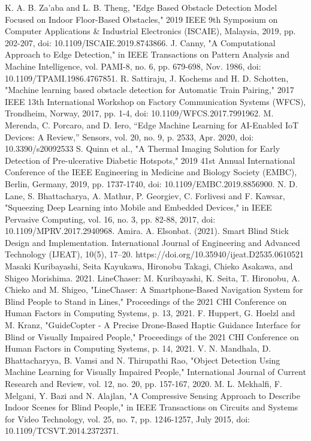 \documentclass[conference]{IEEEtran}
\begin{document}
\begin{thebibliography}{00}
 K. A. B. Za’aba and L. B. Theng, "Edge Based Obstacle Detection Model Focused on Indoor Floor-Based Obstacles," 2019 IEEE 9th Symposium on Computer Applications \& Industrial Electronics (ISCAIE), Malaysia, 2019, pp. 202-207, doi: 10.1109/ISCAIE.2019.8743866.
 J. Canny, "A Computational Approach to Edge Detection," in IEEE Transactions on Pattern Analysis and Machine Intelligence, vol. PAMI-8, no. 6, pp. 679-698, Nov. 1986, doi: 10.1109/TPAMI.1986.4767851.
 R. Sattiraju, J. Kochems and H. D. Schotten, "Machine learning based obstacle detection for Automatic Train Pairing," 2017 IEEE 13th International Workshop on Factory Communication Systems (WFCS), Trondheim, Norway, 2017, pp. 1-4, doi: 10.1109/WFCS.2017.7991962.
 M. Merenda, C. Porcaro, and D. Iero, “Edge Machine Learning for AI-Enabled IoT Devices: A Review,” Sensors, vol. 20, no. 9, p. 2533, Apr. 2020, doi: 10.3390/s20092533
 S. Quinn et al., "A Thermal Imaging Solution for Early Detection of Pre-ulcerative Diabetic Hotspots," 2019 41st Annual International Conference of the IEEE Engineering in Medicine and Biology Society (EMBC), Berlin, Germany, 2019, pp. 1737-1740, doi: 10.1109/EMBC.2019.8856900.
 N. D. Lane, S. Bhattacharya, A. Mathur, P. Georgiev, C. Forlivesi and F. Kawsar, "Squeezing Deep Learning into Mobile and Embedded Devices," in IEEE Pervasive Computing, vol. 16, no. 3, pp. 82-88, 2017, doi: 10.1109/MPRV.2017.2940968.
 Amira. A. Elsonbat. (2021). Smart Blind Stick Design and Implementation. International Journal of Engineering and Advanced Technology (IJEAT), 10(5), 17–20. https://doi.org/10.35940/ijeat.D2535.0610521       
 Masaki Kuribayashi, Seita Kayukawa, Hironobu Takagi, Chieko Asakawa, and Shigeo Morishima. 2021. LineChaser: M. Kuribayashi, K. Seita, T. Hironobu, A. Chieko and M. Shigeo, "LineChaser: A Smartphone-Based Navigation System for Blind People to Stand in Lines," Proceedings of the 2021 CHI Conference on Human Factors in Computing Systems, p. 13, 2021.       
 F. Huppert, G. Hoelzl and M. Kranz, "GuideCopter - A Precise Drone-Based Haptic Guidance Interface for Blind or Visually Impaired People," Proceedings of the 2021 CHI Conference on Human Factors in Computing Systems, p. 14, 2021.      
 V. N. Mandhala, D. Bhattacharyya, B. Vamsi and N. Thirupathi Rao, "Object Detection Using Machine Learning for Visually Impaired People," International Journal of Current Research and Review, vol. 12, no. 20, pp. 157-167, 2020.      
 M. L. Mekhalfi, F. Melgani, Y. Bazi and N. Alajlan, "A Compressive Sensing Approach to Describe Indoor Scenes for Blind People," in IEEE Transactions on Circuits and Systems for Video Technology, vol. 25, no. 7, pp. 1246-1257, July 2015, doi: 10.1109/TCSVT.2014.2372371.
\end{thebibliography}
\vspace{12pt}
\end{document}
